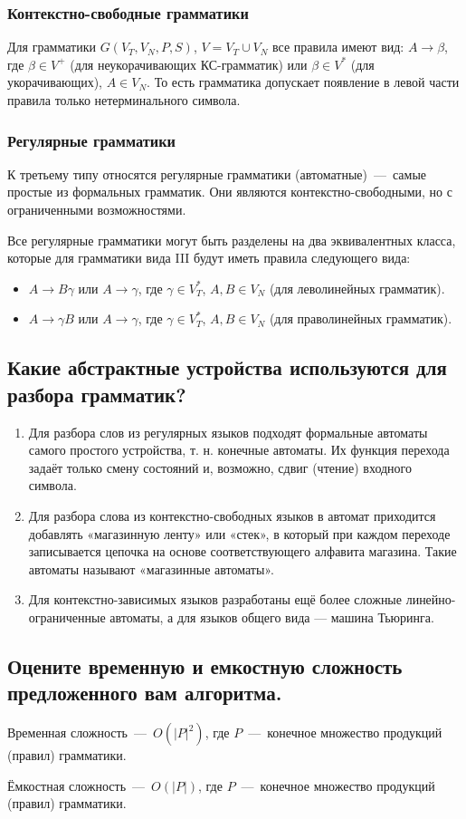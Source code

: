 \subsubsection{Контекстно-свободные грамматики}
Для грамматики $G(V_{T},V_{N},P,S)$, $V=V_{T}\cup V_{N}$ все правила имеют вид: $A\rightarrow \beta$, где $\beta \in V^{+}$ (для неукорачивающих КС-грамматик) или $\beta \in V^{*}$ (для укорачивающих), 
$A\in V_{N}$. То есть грамматика допускает появление в левой части правила только нетерминального символа.

\subsubsection{Регулярные грамматики}
К третьему типу относятся регулярные грамматики (автоматные)~---~самые простые из формальных грамматик. Они являются контекстно-свободными, но с ограниченными возможностями.

Все регулярные грамматики могут быть разделены на два эквивалентных класса, которые для грамматики вида III будут иметь правила следующего вида:
\begin{itemize}
	\item $A\rightarrow B\gamma$ или $A\rightarrow \gamma$, где $\gamma \in V_{T}^{*}$, $A,B\in V_{N}$ (для леволинейных грамматик).
	\item $A\rightarrow \gamma B$ или $A\rightarrow \gamma$, где $\gamma \in V_{T}^{*}$, $A,B\in V_{N}$ (для праволинейных грамматик).
\end{itemize}

\subsection{Какие абстрактные устройства используются для разбора грамматик?}
\begin{enumerate}
	\item Для разбора слов из регулярных языков подходят формальные автоматы самого простого устройства, т. н. конечные автоматы. Их функция перехода задаёт только смену состояний и, возможно, сдвиг (чтение) входного символа.
	\item Для разбора слова из контекстно-свободных языков в автомат приходится добавлять «магазинную ленту» или «стек», в который при каждом переходе записывается цепочка на основе соответствующего алфавита магазина. Такие автоматы называют «магазинные автоматы».
	\item Для контекстно-зависимых языков разработаны ещё более сложные линейно-ограниченные автоматы, а для языков общего вида — машина Тьюринга.
\end{enumerate}

\subsection{Оцените временную и емкостную сложность предложенного вам алгоритма.}

Временная сложность~---~$O(|P|^2)$, где $P$~---~конечное множество продукций (правил) грамматики.

Ёмкостная сложность~---~$O(|P|)$, где $P$~---~конечное множество продукций (правил) грамматики.

\newpage